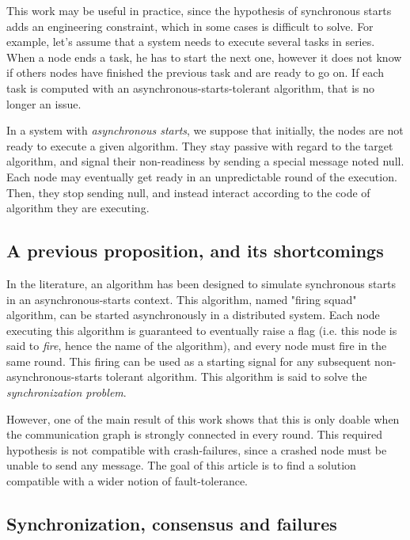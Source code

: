 \documentclass{article}
\begin{document}
This work may be useful in practice, since the hypothesis of synchronous starts adds an engineering constraint, which in some cases is difficult to solve.
For example, let's assume that a system needs to execute several tasks in series.
When a node ends a task, he has to start the next one, however it does not know if others nodes have finished the previous task and are ready to go on.
If each task is computed with an asynchronous-starts-tolerant algorithm, that is no longer an issue.

In a system with \textit{asynchronous starts}, we suppose that initially, the nodes are not ready to execute a given algorithm. They stay passive with regard to the target algorithm, 
and signal their non-readiness by sending a special message noted null. Each node may eventually get ready in an unpredictable round of the execution.
Then, they stop sending null, and instead interact according to the code of algorithm they are executing.

\subsection{A previous proposition, and its shortcomings}

In the literature, an algorithm has been designed to simulate synchronous starts in an asynchronous-starts context.
This algorithm, named "firing squad" algorithm, can be started asynchronously in a distributed system.
Each node executing this algorithm is guaranteed to eventually raise a flag (i.e. this node is said to \textit{fire}, hence the name of the algorithm), and every node must fire in the same round.
This firing can be used as a starting signal for any subsequent non-asynchronous-starts tolerant algorithm.
This algorithm is said to solve the \textit{synchronization problem}.

However, one of the main result of this work shows that this is only doable when the communication graph is strongly connected in every round.
This required hypothesis is not compatible with crash-failures, since a crashed node must be unable to send any message.
The goal of this article is to find a solution compatible with a wider notion of fault-tolerance.

\subsection{Synchronization, consensus and failures}
\end{document}
